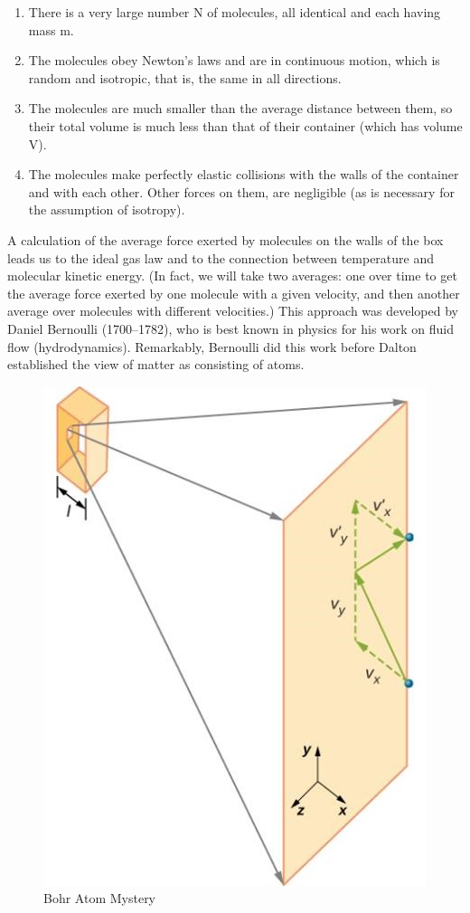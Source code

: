 \documentclass[14pt]{memoir}
\begin{document}
\begin{enumerate}
\item There is a very large number N of molecules, all identical and each having mass m.
\item The molecules obey Newton’s laws and are in continuous motion, which is random and isotropic, that is, the same in all directions.
\item The molecules are much smaller than the average distance between them, so their total volume is much less than that of their container (which has volume V). 
\item The molecules make perfectly elastic collisions with the walls of the container and with each other. Other forces on them, are negligible (as is necessary for the assumption of isotropy).
\end{enumerate}

A calculation of the average force exerted by molecules on the walls of the box leads us to the ideal gas law and to the connection between temperature and molecular kinetic energy. (In fact, we will take two averages: one over time to get the average force exerted by one molecule with a given velocity, and then another average over molecules with different velocities.) This approach was developed by Daniel Bernoulli (1700–1782), who is best known in physics for his work on fluid flow (hydrodynamics). Remarkably, Bernoulli did this work before Dalton established the view of matter as consisting of atoms.

\begin{figure}[H]
\begin{center}
\includegraphics[scale=.5]{fig/fig_02_10.jpg}
\caption{Bohr Atom Mystery}
\label{fig:02_10}
\end{center}
\end{figure} 
\end{document}
